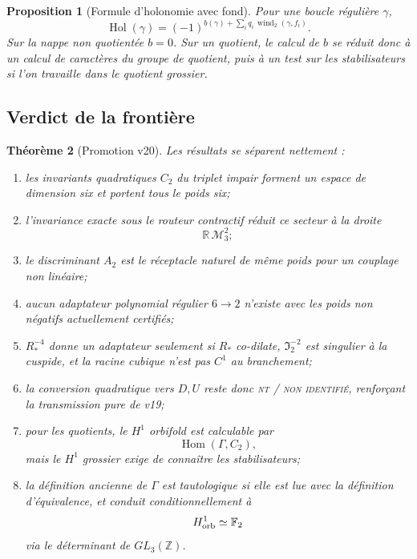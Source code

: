 \documentclass[11pt,a4paper]{article}
\newtheorem{theorem}{Théorème}[section]
\newtheorem{proposition}[theorem]{Proposition}
\newcommand{\statusNT}{\textsc{nt / non identifié}}
\begin{document}
\begin{proposition}[Formule d'holonomie avec fond]\label{prop:v20-hol-background}
Pour une boucle régulière $\gamma$,
\[
 \boxed{
 \operatorname{Hol}(\gamma)
 =
 (-1)^{
 b(\gamma)
 +
 \sum_i q_i\,\operatorname{wind}_2(\gamma,f_i)
 }.}
\]
Sur la nappe non quotientée $b=0$. Sur un quotient, le calcul de $b$ se réduit donc à un calcul de caractères du groupe de quotient, puis à un test sur les stabilisateurs si l'on travaille dans le quotient grossier.
\end{proposition}

\subsection{Verdict de la frontière}

\begin{theorem}[Promotion v20]\label{thm:v20-verdict}
Les résultats se séparent nettement :
\begin{enumerate}[label=\textup{(\roman*)}]
\item les invariants quadratiques $C_2$ du triplet impair forment un espace de dimension six et portent tous le poids six;
\item l'invariance exacte sous le routeur contractif réduit ce secteur à la droite
\[
 \mathbb R\,\mathcal M_3^2;
\]
\item le discriminant $A_2$ est le réceptacle naturel de même poids pour un couplage non linéaire;
\item aucun adaptateur polynomial régulier $6\to2$ n'existe avec les poids non négatifs actuellement certifiés;
\item $R_*^{-4}$ donne un adaptateur seulement si $R_*$ co-dilate, $\mathfrak I_2^{-2}$ est singulier à la cuspide, et la racine cubique n'est pas $C^1$ au branchement;
\item la conversion quadratique vers $D,U$ reste donc \statusNT{}, renforçant la transmission pure de v19;
\item pour les quotients, le $H^1$ orbifold est calculable par
\[
 \operatorname{Hom}(\Gamma,C_2),
\]
mais le $H^1$ grossier exige de connaître les stabilisateurs;
\item la définition ancienne de $\Gamma$ est tautologique si elle est lue avec la définition d'équivalence, et conduit conditionnellement à
\[
 H^1_{\rm orb}\simeq\mathbb F_2
\]
via le déterminant de $GL_3(\mathbb Z)$.
\end{enumerate}
\end{theorem}
\end{document}
